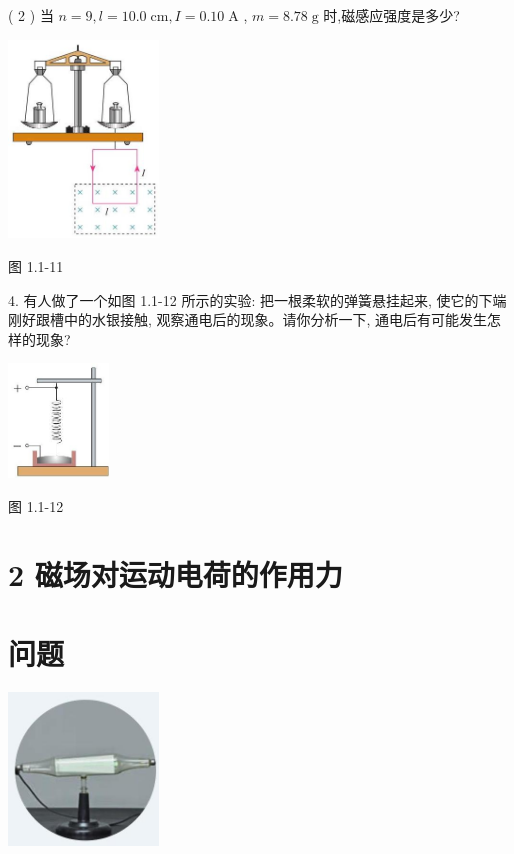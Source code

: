 \documentclass[10pt]{article}
\begin{document}
( 2 ) 当 \(n = 9,l = {10.0}\mathrm{\;{cm}},I = {0.10}\mathrm{\;A}\) , \(m = {8.78}\mathrm{\;g}\) 时,磁感应强度是多少?

\begin{center}
\includegraphics[max width=0.3\textwidth]{images/01910e72-c5b7-7ed5-a6d4-fb3a5faefc32_12_493453.jpg}
\end{center}

图 1.1-11

4. 有人做了一个如图 1.1-12 所示的实验: 把一根柔软的弹簧悬挂起来, 使它的下端刚好跟槽中的水银接触, 观察通电后的现象。请你分析一下, 通电后有可能发生怎样的现象?

\begin{center}
\includegraphics[max width=0.2\textwidth]{images/01910e72-c5b7-7ed5-a6d4-fb3a5faefc32_12_735189.jpg}
\end{center}

图 1.1-12

\section*{2 磁场对运动电荷的作用力}

\section*{问题}

\begin{center}
\includegraphics[max width=0.3\textwidth]{images/01910e72-c5b7-7ed5-a6d4-fb3a5faefc32_13_252820.jpg}
\end{center}
\end{document}

